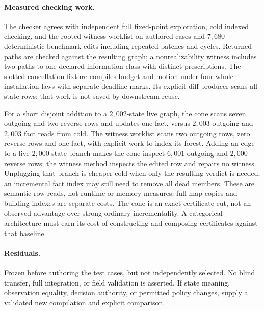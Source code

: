 \documentclass{article}
\begin{document}
\paragraph{Measured checking work.}
The checker agrees with independent full fixed-point exploration, cold
indexed checking, and the rooted-witness worklist on authored cases and
$7{,}680$ deterministic benchmark edits including repeated patches and
cycles. Returned paths are checked against the resulting graph; a
nonrealizability witness includes two paths to one declared information
class with distinct prescriptions. The slotted cancellation fixture
compiles budget and motion under four whole-installation laws with
separate deadline marks. Its explicit diff producer scans all state
rows; that work is not saved by downstream reuse.

For a short disjoint addition to a $2{,}002$-state live graph, the cone
scans seven outgoing and two reverse rows and updates one fact, versus
$2{,}003$ outgoing and $2{,}003$ fact reads from cold. The witness worklist
scans two outgoing rows, zero reverse rows and one fact, with explicit
work to index its forest. Adding an edge to a live $2{,}000$-state branch
makes the cone inspect $6{,}001$ outgoing and $2{,}000$ reverse rows;
the witness method inspects the edited row and repairs no witness.
Unplugging that branch is cheaper cold when only the resulting verdict
is needed; an incremental fact index may still need to remove all dead
members. These are semantic row reads, not runtime or memory measures;
full-map copies and building indexes are separate costs.
The cone is an exact certificate cut, not an observed advantage over
strong ordinary incrementality. A categorical architecture must earn
its cost of constructing and composing certificates against that baseline.

\paragraph{Residuals.}
Frozen before authoring the test cases, but not independently selected.
No blind transfer, full integration, or field validation is asserted.
If state meaning, observation equality, decision authority, or permitted
policy changes, supply a validated new compilation and explicit comparison.
\end{document}

